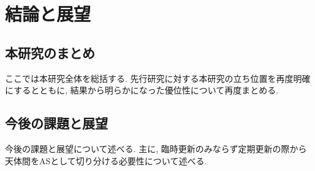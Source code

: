\chapter{結論と展望}
\label{chap:conclusion}
\section{本研究のまとめ}
ここでは本研究全体を総括する. 先行研究に対する本研究の立ち位置を再度明確にするとともに, 
結果から明らかになった優位性について再度まとめる. 
\section{今後の課題と展望}
今後の課題と展望について述べる. 主に, 臨時更新のみならず定期更新の際から
天体間をASとして切り分ける必要性について述べる. 